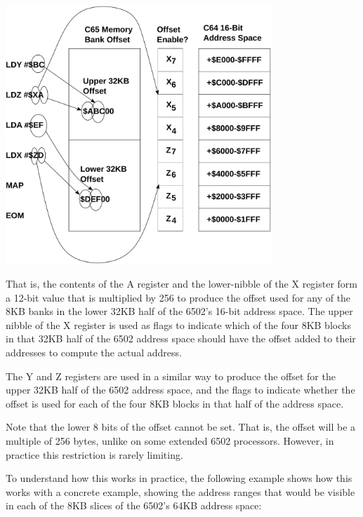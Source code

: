\begin{center}
  \includegraphics[width=0.75\textwidth]{images/illustrations/map-instruction-operation.pdf}
\end{center}

That is, the contents of the A register and the lower-nibble of the X register form a 12-bit value
that is multiplied by 256 to produce the offset used for any of the 8KB banks in the lower 32KB half of the 6502's 16-bit address
space.  The upper nibble of the X register is used as flags to indicate which of the four 8KB blocks in that 32KB half of the
6502 address space should have the offset added to their addresses to compute the actual address.

The Y and Z registers are used in a similar way to produce the offset for the upper 32KB half of the 6502 address space, and the
flags to indicate whether the offset is used for each of the four 8KB blocks in that half of the address space.

Note that the lower 8 bits of the offset cannot be set. That is, the offset will be a multiple of 256
bytes, unlike on some extended 6502 processors.  However, in practice this restriction is rarely
limiting.

To understand how this works in practice, the following example shows how this works with a concrete
example, showing the address ranges that would be visible in each of the 8KB slices of the 6502's
64KB address space:

